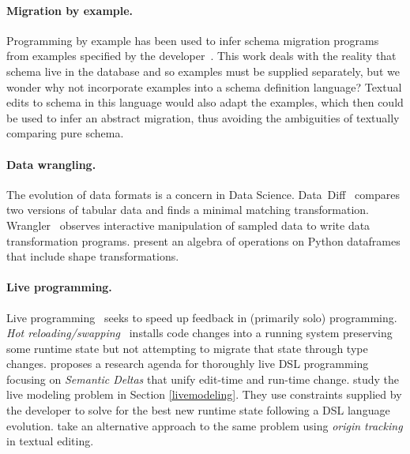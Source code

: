 \documentclass[english,submission]{programming}
\begin{document}
\paragraph{Migration by example.}
Programming by example has been used to infer schema migration programs from examples specified by the developer~\cite{wang20, Alexe11}.
This work deals with the reality that schema live in the database and so examples must be supplied separately, but we wonder why not incorporate examples into a schema definition language? Textual edits to schema in this language would also adapt the examples, which then could be used to infer an abstract migration, thus avoiding the ambiguities of textually comparing pure schema.

\paragraph{Data wrangling.} The evolution of data formats is a concern in Data Science. Data~Diff~\cite{sutton18} compares two versions of tabular data and finds a minimal matching transformation.
Wrangler~\cite{kandel11} observes interactive manipulation of sampled data to write data transformation programs.
\citet{petersohn20} present an algebra of operations on Python dataframes that include shape transformations.

\paragraph{Live programming.}
Live programming~\cite{tanimoto90, rein2018exploratory} seeks to speed up feedback in (primarily solo) programming.
\emph{Hot reloading/swapping}~\cite{barenz2020essence, hicks2005dynamic} installs code changes into a running system preserving some runtime state but not attempting to migrate that state through type changes.
\citet{SemanticDeltas} proposes a research agenda for thoroughly live DSL programming focusing on \emph{Semantic Deltas} that unify edit-time and run-time change.
\citet{RuntimeConstraint} study the live modeling problem in Section \ref{livemodeling}. They use constraints supplied by the developer to solve for the best new runtime state following a DSL language evolution. \citet{vanRozen19} take an alternative approach to the same problem using \emph{origin tracking} in textual editing.


\end{document}
